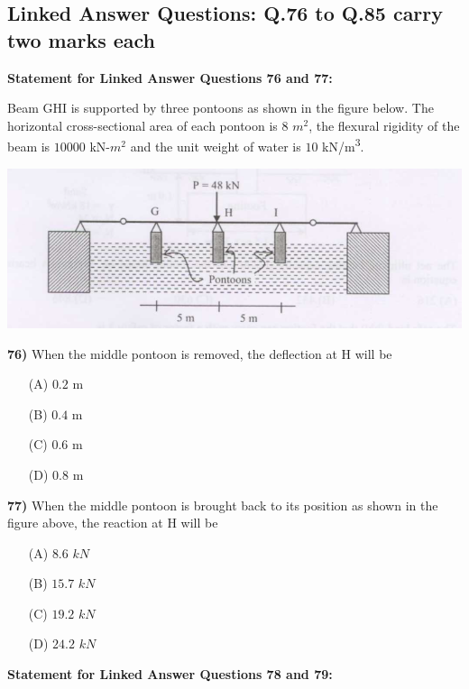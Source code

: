 \documentclass[journal]{IEEEtran}
\begin{document}
\begin{enumerate}
\section*{Linked Answer Questions: Q.76 to Q.85 carry two marks each}

\textbf{Statement for Linked Answer Questions 76 and 77:}

Beam GHI is supported by three pontoons as shown in the figure below. The horizontal cross-sectional area of each pontoon is $8$ $m^{2}$, the flexural rigidity of the beam is $10000$ kN-$m^{2}$ and the unit weight of water is $10$ kN/m\textsuperscript{3}.

\vspace{0.3cm}
\includegraphics[width=\textwidth]{figs/fig9.png} 
\vspace{0.3cm}

\textbf{76)} \hspace{0.2cm} When the middle pontoon is removed, the deflection at H will be \textbf{}
\begin{itemize}
    \item[(A)] $0.2$ m
    \item[(B)] $0.4$ m
    \item[(C)] $0.6$ m
    \item[(D)] $0.8$ m
\end{itemize}

\textbf{77)} \hspace{0.2cm} When the middle pontoon is brought back to its position as shown in the figure above, the reaction at H will be \textbf{}
\begin{itemize}
    \item[(A)] $8.6$ $kN$
    \item[(B)] $15.7$ $kN$
    \item[(C)] $19.2$ $kN$
    \item[(D)] $24.2$ $kN$
\end{itemize}

\vspace{0.5cm}
\textbf{Statement for Linked Answer Questions 78 and 79:}


\end{enumerate}
\end{document}
